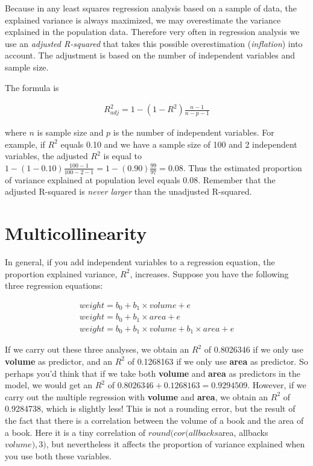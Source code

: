 \documentclass[]{report}\usepackage[]{graphicx}\usepackage[]{color}
\begin{document}
Because in any least squares regression analysis based on a sample of data, the explained variance is always maximized, we may overestimate the variance explained in the population data. Therefore very often in regression analysis we use an \textit{adjusted R-squared} that takes this possible overestimation (\textit{inflation}) into account. The adjustment is based on the number of independent variables and sample size.

The formula is


\begin{eqnarray}
R^2_{adj}= 1 - (1-R^2)\frac{n-1}{n-p-1} \nonumber
\end{eqnarray}

where $n$ is sample size and $p$ is the number of independent variables. For example, if $R^2$ equals 0.10 and we have a sample size of 100 and 2 independent variables, the adjusted $R^2$ is equal to $1 - (1-0.10)\frac{100-1}{100-2-1}= 1 - (0.90)\frac{99}{97}=0.08$. Thus the estimated proportion of variance explained at population level equals 0.08. Remember that the adjusted R-squared is \textit{never larger} than the unadjusted R-squared.




\section{Multicollinearity}

In general, if you add independent variables to a regression equation, the proportion explained variance, $R^2$, increases. Suppose you have the following three regression equations:

\begin{eqnarray}
weight = b_0 + b_1 \times  volume + e \\
weight = b_0 + b_1 \times  area + e \\
weight = b_0 + b_1 \times  volume + b_1 \times  area + e
\end{eqnarray}

If we carry out these three analyses, we obtain an $R^2$ of 0.8026346 if we only use \textbf{volume} as predictor, and an $R^2$ of 0.1268163 if we only use \textbf{area} as predictor. So perhaps you'd think that if we take both \textbf{volume} and \textbf{area} as predictors in the model, we would get an $R^2$ of $0.8026346+0.1268163= 0.9294509$. However, if we carry out the multiple regression with \textbf{volume} and \textbf{area}, we obtain an $R^2$ of 0.9284738, which is slightly less! This is not a rounding error, but the result of the fact that there is a correlation between the volume of a book and the area of a book. Here it is a tiny correlation of $round(cor(allbacks$area, allbacks$volume),3)$, but nevertheless it affects the proportion of variance explained when you use both these variables.
\end{document}

